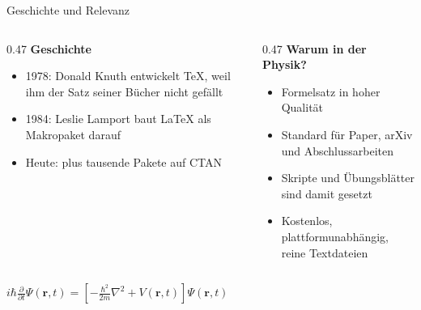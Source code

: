 \begin{frame}{Geschichte und Relevanz}
  \begin{columns}[T]
    \begin{column}{0.47\textwidth}
      \textbf{Geschichte}\par\vspace{0.4em}
      \begin{itemize}
        \item \alert{1978:} Donald Knuth entwickelt \TeX, weil ihm der Satz seiner Bücher nicht gefällt
        \item \alert{1984:} Leslie Lamport baut \LaTeX{} als Makropaket darauf
        \item \alert{Heute:} \LaTeXe{} plus tausende Pakete auf CTAN
      \end{itemize}
    \end{column}
    \begin{column}{0.47\textwidth}
      \textbf{Warum in der Physik?}\par\vspace{0.4em}
      \begin{itemize}
        \item Formelsatz in hoher Qualität
        \item Standard für Paper, arXiv und Abschlussarbeiten
        \item Skripte und Übungsblätter sind damit gesetzt
        \item Kostenlos, plattformunabhängig, reine Textdateien
      \end{itemize}
    \end{column}
  \end{columns}
  \vspace{0.3em}
  \begin{tcolorbox}[enhanced, colback=white, colframe=hell, boxrule=0.8pt, arc=4pt, halign=center]
    $\displaystyle i\hbar\frac{\partial}{\partial t}\Psi(\mathbf{r},t)
      = \left[-\frac{\hbar^2}{2m}\nabla^2 + V(\mathbf{r},t)\right]\Psi(\mathbf{r},t)$
  \end{tcolorbox}
\end{frame}
